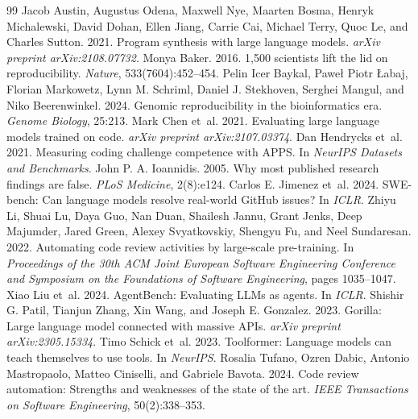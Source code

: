\documentclass[11pt]{article}
\begin{document}
\begingroup\small
\begin{thebibliography}{99}
 Jacob Austin, Augustus Odena, Maxwell Nye, Maarten Bosma, Henryk Michalewski, David Dohan, Ellen Jiang, Carrie Cai, Michael Terry, Quoc Le, and Charles Sutton. 2021. Program synthesis with large language models. \emph{arXiv preprint arXiv:2108.07732}.
 Monya Baker. 2016. 1,500 scientists lift the lid on reproducibility. \emph{Nature}, 533(7604):452--454.
 Pelin Icer Baykal, Pawe{\l} Piotr {\L}abaj, Florian Markowetz, Lynn M. Schriml, Daniel J. Stekhoven, Serghei Mangul, and Niko Beerenwinkel. 2024. Genomic reproducibility in the bioinformatics era. \emph{Genome Biology}, 25:213.
 Mark Chen et~al. 2021. Evaluating large language models trained on code. \emph{arXiv preprint arXiv:2107.03374}.
 Dan Hendrycks et~al. 2021. Measuring coding challenge competence with APPS. In \emph{NeurIPS Datasets and Benchmarks}.
 John P. A. Ioannidis. 2005. Why most published research findings are false. \emph{PLoS Medicine}, 2(8):e124.
 Carlos E. Jimenez et~al. 2024. SWE-bench: Can language models resolve real-world GitHub issues? In \emph{ICLR}.
 Zhiyu Li, Shuai Lu, Daya Guo, Nan Duan, Shailesh Jannu, Grant Jenks, Deep Majumder, Jared Green, Alexey Svyatkovskiy, Shengyu Fu, and Neel Sundaresan. 2022. Automating code review activities by large-scale pre-training. In \emph{Proceedings of the 30th ACM Joint European Software Engineering Conference and Symposium on the Foundations of Software Engineering}, pages 1035--1047.
 Xiao Liu et~al. 2024. AgentBench: Evaluating LLMs as agents. In \emph{ICLR}.
 Shishir G. Patil, Tianjun Zhang, Xin Wang, and Joseph E. Gonzalez. 2023. Gorilla: Large language model connected with massive APIs. \emph{arXiv preprint arXiv:2305.15334}.
 Timo Schick et~al. 2023. Toolformer: Language models can teach themselves to use tools. In \emph{NeurIPS}.
 Rosalia Tufano, Ozren Dabic, Antonio Mastropaolo, Matteo Ciniselli, and Gabriele Bavota. 2024. Code review automation: Strengths and weaknesses of the state of the art. \emph{IEEE Transactions on Software Engineering}, 50(2):338--353.

\end{thebibliography}
\end{document}
